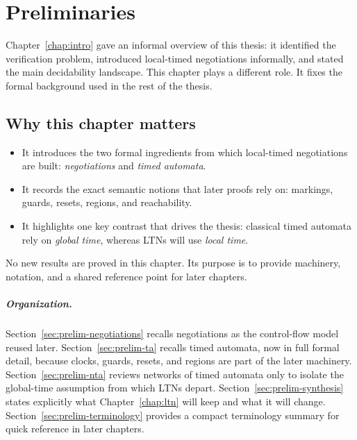 
\chapter{Preliminaries}
\label{chap:preliminaries}

Chapter~\ref{chap:intro} gave an informal overview of this thesis: it identified the verification problem, introduced local-timed negotiations informally, and stated the main decidability landscape. This chapter plays a different role. It fixes the formal background used in the rest of the thesis.

\section*{Why this chapter matters}
\begin{itemize}
    \item It introduces the two formal ingredients from which local-timed negotiations are built: \emph{negotiations} and \emph{timed automata}.
    \item It records the exact semantic notions that later proofs rely on: markings, guards, resets, regions, and reachability.
    \item It highlights one key contrast that drives the thesis: classical timed automata rely on \emph{global time}, whereas LTNs will use \emph{local time}.
\end{itemize}

\noindent No new results are proved in this chapter. Its purpose is to provide machinery, notation, and a shared reference point for later chapters.

\paragraph{Organization.}
Section~\ref{sec:prelim-negotiations} recalls negotiations as the control-flow model reused later. Section~\ref{sec:prelim-ta} recalls timed automata, now in full formal detail, because clocks, guards, resets, and regions are part of the later machinery. Section~\ref{sec:prelim-nta} reviews networks of timed automata only to isolate the global-time assumption from which LTNs depart. Section~\ref{sec:prelim-synthesis} states explicitly what Chapter~\ref{chap:ltn} will keep and what it will change. Section~\ref{sec:prelim-terminology} provides a compact terminology summary for quick reference in later chapters.

